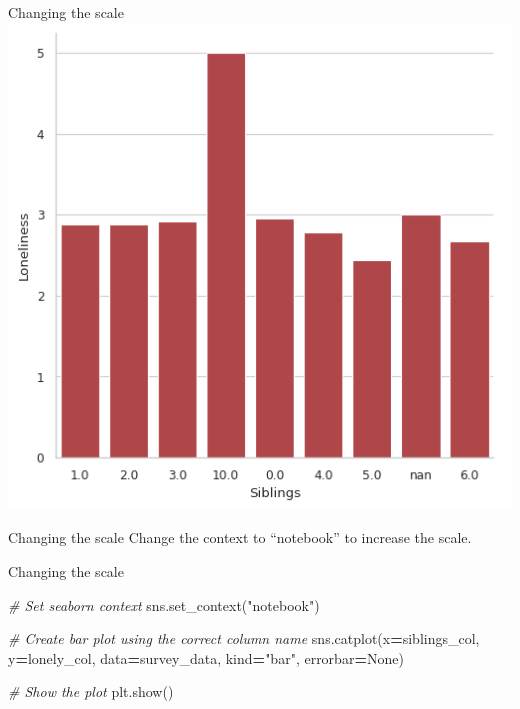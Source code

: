 \documentclass[
  ignorenonframetext,
]{beamer}
\newenvironment{Shaded}{\begin{snugshade}}{\end{snugshade}}
\newcommand{\CommentTok}[1]{\textcolor[rgb]{0.56,0.35,0.01}{\textit{#1}}}
\newcommand{\NormalTok}[1]{#1}
\newcommand{\OperatorTok}[1]{\textcolor[rgb]{0.81,0.36,0.00}{\textbf{#1}}}
\newcommand{\StringTok}[1]{\textcolor[rgb]{0.31,0.60,0.02}{#1}}
\newcommand{\VariableTok}[1]{\textcolor[rgb]{0.00,0.00,0.00}{#1}}
\begin{document}
\begin{frame}{Changing the scale}
\label{changing-the-scale-7}
\includegraphics{../images/im299.png}
\end{frame}

\begin{frame}{Changing the scale}
\label{changing-the-scale-8}
Change the context to ``notebook'' to increase the scale.
\end{frame}

\begin{frame}[fragile]{Changing the scale}
\label{changing-the-scale-9}

\begin{Shaded}
\begin{Highlighting}[]
\CommentTok{\# Set seaborn context}
\NormalTok{sns.set\_context(}\StringTok{"notebook"}\NormalTok{)}

\CommentTok{\# Create bar plot using the correct column name}
\NormalTok{sns.catplot(x}\OperatorTok{=}\NormalTok{siblings\_col, y}\OperatorTok{=}\NormalTok{lonely\_col, }
\NormalTok{            data}\OperatorTok{=}\NormalTok{survey\_data, kind}\OperatorTok{=}\StringTok{"bar"}\NormalTok{, errorbar}\OperatorTok{=}\VariableTok{None}\NormalTok{)}

\CommentTok{\# Show the plot}
\NormalTok{plt.show()}
\end{Highlighting}
\end{Shaded}
\end{frame}
\end{document}
